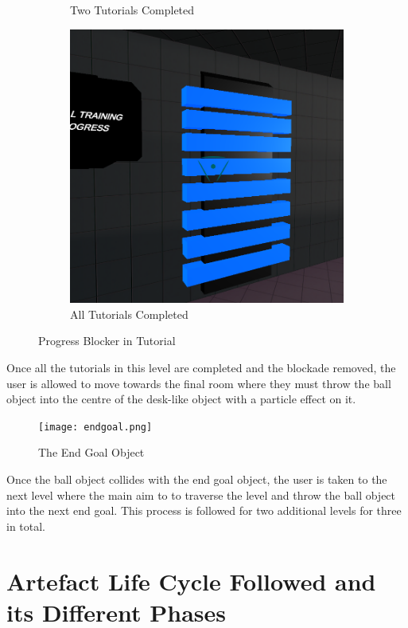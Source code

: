 \begin{figure}[H]
\begin{subfigure}{0.3\textwidth}
  \caption{Two Tutorials Completed}
\end{subfigure}
\begin{subfigure}{0.3\textwidth}
  \centering
  \includegraphics[width=1\linewidth]{Figures/barrier0.png}
  \caption{All Tutorials Completed}
\end{subfigure}
\caption{Progress Blocker in Tutorial}
\end{figure}

\noindent Once all the tutorials in this level are completed and the blockade removed, the user is allowed to move towards the final room where they must throw the ball object into the centre of the desk-like object with a particle effect on it.

\begin{figure}[H]
\centering
\centerline{\texttt{[image: endgoal.png]}}
\caption{The End Goal Object}
\end{figure}

\noindent Once the ball object collides with the end goal object, the user is taken to the next level where the main aim to to traverse the level and throw the ball object into the next end goal. This process is followed for two additional levels for three in total.

\section{Artefact Life Cycle Followed and its Different Phases}

